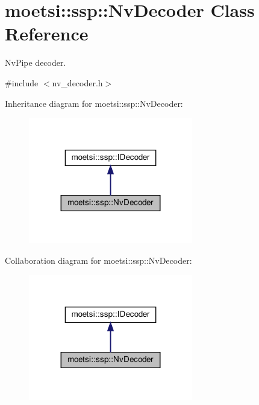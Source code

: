 \hypertarget{classmoetsi_1_1ssp_1_1NvDecoder}{}\section{moetsi\+:\+:ssp\+:\+:Nv\+Decoder Class Reference}
\label{classmoetsi_1_1ssp_1_1NvDecoder}


Nv\+Pipe decoder.  




{\ttfamily \#include $<$nv\+\_\+decoder.\+h$>$}



Inheritance diagram for moetsi\+:\+:ssp\+:\+:Nv\+Decoder\+:
\nopagebreak
\begin{figure}[H]
\begin{center}
\leavevmode
\includegraphics[width=203pt]{classmoetsi_1_1ssp_1_1NvDecoder__inherit__graph}
\end{center}
\end{figure}


Collaboration diagram for moetsi\+:\+:ssp\+:\+:Nv\+Decoder\+:
\nopagebreak
\begin{figure}[H]
\begin{center}
\leavevmode
\includegraphics[width=203pt]{classmoetsi_1_1ssp_1_1NvDecoder__coll__graph}
\end{center}
\end{figure}
